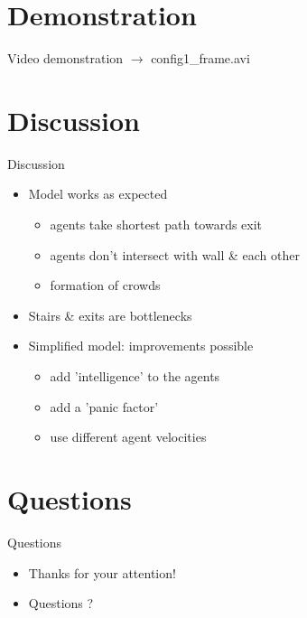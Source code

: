 \section{Demonstration}

\begin{frame}{Video demonstration}
$\rightarrow$ config1\_frame.avi
\end{frame}


\section{Discussion}

\begin{frame}{Discussion}
\begin{itemize}
	\item Model works as expected
		\begin{itemize}
			\item agents take shortest path towards exit
			\item agents don't intersect with wall \& each other
			\item formation of crowds
		\end{itemize}
	\item Stairs \& exits are bottlenecks
	\item Simplified model: improvements possible
		\begin{itemize}
			\item add 'intelligence' to the agents
			\item add a 'panic factor'
			\item use different agent velocities
		\end{itemize}
\end{itemize}
\end{frame}


\section{Questions}

\begin{frame}{Questions}
	\begin{itemize}
		\item Thanks for your attention!
		\item Questions ?
	\end{itemize}
\end{frame}
